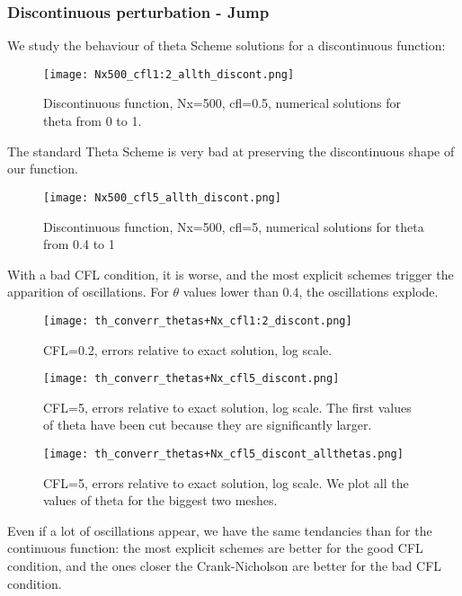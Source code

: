 \documentclass[12pt]{article}
\begin{document}
\subsubsection*{Discontinuous perturbation - Jump}
We study the behaviour of theta Scheme solutions for a discontinuous function:

\begin{figure}[H]
    \centering
    \texttt{[image: Nx500\_cfl1:2\_allth\_discont.png]}
    \caption{Discontinuous function, Nx=500, cfl=0.5, numerical solutions for theta from 0 to 1.}
\end{figure}
The standard Theta Scheme is very bad at preserving the discontinuous shape of our function.

\begin{figure}[H]
    \centering
    \texttt{[image: Nx500\_cfl5\_allth\_discont.png]}
    \caption{Discontinuous function, Nx=500, cfl=5, numerical solutions for theta from 0.4 to 1}
\end{figure}
With a bad CFL condition, it is worse, and the most explicit schemes trigger the apparition of oscillations. For $\theta$ values lower than $0.4$, the oscillations explode.

\begin{figure}[H]
    \centering
    \texttt{[image: th\_converr\_thetas+Nx\_cfl1:2\_discont.png]}
    \caption{CFL=0.2, errors relative to exact solution, log scale.}
\end{figure}

\begin{figure}[H]
    \centering
    \texttt{[image: th\_converr\_thetas+Nx\_cfl5\_discont.png]}
    \caption{CFL=5, errors relative to exact solution, log scale. The first values of theta have been cut because they are significantly larger.}
\end{figure}

\begin{figure}[H]
    \centering
    \texttt{[image: th\_converr\_thetas+Nx\_cfl5\_discont\_allthetas.png]}
    \caption{CFL=5, errors relative to exact solution, log scale. We plot all the values of theta for the biggest two meshes.}
\end{figure}
Even if a lot of oscillations appear, we have the same tendancies than for the continuous function:
the most explicit schemes are better for the good CFL condition, and the ones closer the Crank-Nicholson are better for the bad CFL condition.\\
\end{document}
